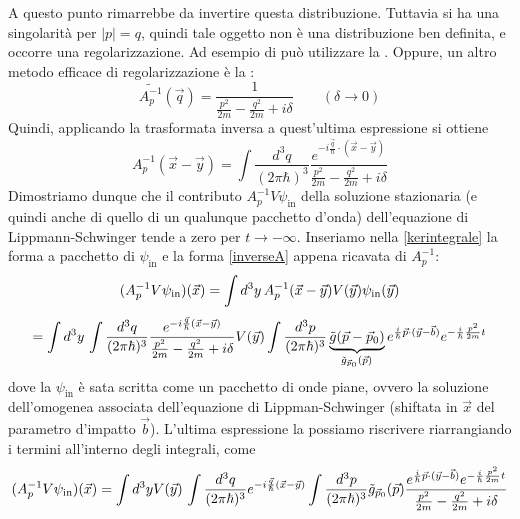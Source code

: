 \documentclass[../../FisicaTeorica.tex]{subfiles}
\begin{document}
A questo punto rimarrebbe da invertire questa distribuzione. Tuttavia si ha
una singolarit{\`a} per $| p | = q$, quindi tale oggetto non {\`e} una
distribuzione ben definita, e occorre una regolarizzazione. Ad esempio di
pu{\`o} utilizzare la . Oppure, un altro metodo
efficace di regolarizzazione {\`e} la :
\[ \widetilde{A_p^{- 1}} (\vec{q}) = \frac{1}{\frac{p^2}{2 m} - \frac{q^2}{2
   m} + i \delta} \qquad (\delta \rightarrow 0) \]
Quindi, applicando la trasformata inversa a quest'ultima espressione si
ottiene
\begin{equation}
\label{inverseA} A_p^{- 1}  (\vec{x} - \vec{y}) = \int \frac{d^3 q}{(2 \pi
   \hbar)^3}  \frac{e^{- i \frac{\vec{q}}{\hbar} \cdot (\vec{x} -
   \vec{y})}}{\frac{p^2}{2 m} - \frac{q^2}{2 m} + i \delta}
\end{equation}
Dimostriamo dunque che il contributo $A_p^{- 1} V \psi_{\text{in}}$ della
soluzione stazionaria (e quindi anche di quello di un qualunque pacchetto
d'onda) dell'equazione di Lippmann-Schwinger tende a zero per $t \to -
\infty$. Inseriamo nella \eqref{kerintegrale} la
forma a pacchetto di $\psi_{\text{in}}$ e la forma \eqref{inverseA} appena ricavata di $A_p^{-
1}$:
\[ (A_p^{- 1} V \psi_{\text{in}}) (\vec{x}) = \int d^3 y \hspace{0.17em}
   A_p^{- 1} (\vec{x} - \vec{y}) V (\vec{y}) \psi_{\text{in}} (\vec{y}) \]
\[ = \int d^3 y \hspace{0.17em} \int \frac{d^3 q}{(2 \pi \hbar)^3}  \frac{e^{-
   i \frac{\vec{q}}{\hbar}  (\vec{x} - \vec{y})}}{\frac{p^2}{2 m} -
   \frac{q^2}{2 m} + i \delta} V (\vec{y})  \int \frac{d^3 p}{(2 \pi \hbar)^3}
   \underbrace{\tilde{g} (\vec{p} - \vec{p}_0)}_{\tilde{g}_{\vec{p}_0}
   (\vec{p})_{}} e^{\frac{i}{\hbar}  \vec{p} \cdot (\vec{y} - \vec{b})} e^{-
   \frac{i}{\hbar}  \frac{p^2}{2 m} t} \]
dove la $\psi_{\text{in}}$ {\`e} sata scritta come un pacchetto di onde piane,
ovvero la soluzione dell'omogenea associata dell'equazione di
Lippman-Schwinger (shiftata in $\vec{x}$ del parametro d'impatto $\vec{b}$).
L'ultima espressione la possiamo riscrivere riarrangiando i termini
all'interno degli integrali, come
\[ (A_p^{- 1} V \psi_{\text{in}}) (\vec{x}) = \int d^3 yV (\vec{y}) \hspace{0.17em} \int \frac{d^3 q}{(2 \pi \hbar)^3}
   e^{- i \frac{\vec{q}}{\hbar}  (\vec{x} - \vec{y})}  \int \frac{d^3 p}{(2
   \pi \hbar)^3}  \tilde{g}_{\vec{p}_0} (\vec{p}) \frac{e^{\frac{i}{\hbar} 
   \vec{p} \cdot (\vec{y} - \vec{b})} e^{- \frac{i}{\hbar}  \frac{p^2}{2 m}
   t}}{\frac{p^2}{2 m} - \frac{q^2}{2 m} + i \delta} \]
\end{document}
